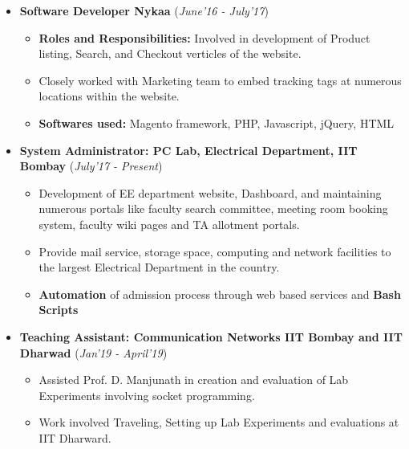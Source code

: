 \documentclass[10pt]{article}
\begin{document}
\colorbox{bl}{}
\vspace{-0.55cm}
\begin{itemize}[leftmargin=0.4cm]
	\item \textbf{Software Developer \textpipe  \hspace{0.05cm} Nykaa} \hfill{(\textit{June'16 - July'17})}\\
	\vspace{-0.65cm}
	\begin{itemize}
		\item \textbf{Roles and Responsibilities:} Involved in development of Product listing, Search, and Checkout verticles of the website.
		\item Closely worked with Marketing team to embed  tracking tags at numerous locations within the website.
		\item \textbf{Softwares used:} Magento framework, PHP, Javascript, jQuery, HTML
	\end{itemize}
	\item \textbf{System Administrator:\hspace{0.05cm} PC Lab, Electrical Department, IIT Bombay} \hfill{(\textit{July'17 - Present})}\\
	\vspace{-0.65cm}
	\begin{itemize}
		\item Development of EE department website, Dashboard, and maintaining numerous portals like faculty search committee, meeting room booking system, faculty wiki pages and TA allotment portals.
		\item Provide mail service, storage space, computing and network facilities to the largest Electrical Department in the country.
		\item \textbf{Automation} of admission process through web based services and \textbf{Bash Scripts}
	\end{itemize}
	
	\item \textbf{Teaching Assistant:\hspace{0.05cm} Communication Networks IIT Bombay and IIT Dharwad} \hfill{(\textit{Jan'19 - April'19})}\\
	\vspace{-0.65cm}
	\begin{itemize}
		\item Assisted Prof. D. Manjunath in creation and evaluation of Lab Experiments involving socket programming.
		\item Work involved Traveling, Setting up Lab Experiments and evaluations at IIT Dharward.
	\end{itemize}
\end{itemize}
\end{document}

